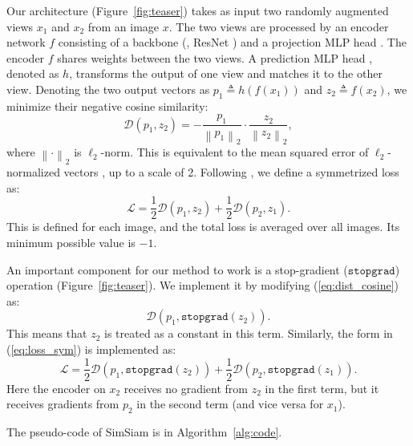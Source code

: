 \documentclass[final]{cvpr}
\newcommand{\dist}{\mathcal{D}}
\newcommand{\p}{{p}}  \newcommand{\z}{{z}}
\begin{document}
Our architecture (Figure~\ref{fig:teaser}) takes as input two randomly augmented views $x_1$ and $x_2$ from an image $x$.
The two views are processed by an encoder network $f$ consisting of a backbone (\eg, ResNet \cite{He2016}) and a projection MLP head \cite{Chen2020}. The encoder $f$ shares weights between the two views. A prediction MLP head \cite{Grill2020}, denoted as $h$, transforms the output of one view and matches it to the other view.
Denoting the two output vectors as $\p_1\!\triangleq\!h(f(x_1))$ and $\z_2\!\triangleq\!f(x_2)$,
we minimize their negative cosine similarity:
\newcommand{\lnorm}[1]{\frac{#1}{\left\lVert{#1}\right\rVert _2}}
\newcommand{\lnormv}[1]{{#1}/{\left\lVert{#1}\right\rVert _2}}
\begin{equation}
\dist(\p_1, \z_2) = - \lnorm{\p_1}{\cdot}\lnorm{\z_2},
\label{eq:dist_cosine}
\end{equation}
where ${\left\lVert{\cdot}\right\rVert _2}$ is $\ell_2$-norm. This is equivalent to the mean squared error of $\ell_2$-normalized vectors \cite{Grill2020}, up to a scale of 2.
Following \cite{Grill2020}, we define a symmetrized loss as:
\begin{equation}
\mathcal{L} = \frac{1}{2}\dist(\p_1, \z_2) + \frac{1}{2}\dist(\p_2, \z_1).
\label{eq:loss_sym}
\end{equation} 
This is defined for each image, and the total loss is averaged over all images. Its minimum possible value is $-1$.

An important component for our method to work is a \mbox{stop-gradient} ($\texttt{stopgrad}$) operation (Figure~\ref{fig:teaser}). We implement it by modifying (\ref{eq:dist_cosine}) as:
\begin{equation}
\dist(\p_1, \texttt{stopgrad}(\z_2)).
\label{eq:loss_asym_stopgrad}
\end{equation}
This means that $\z_2$ is treated as a constant in this term.
Similarly, the form in (\ref{eq:loss_sym}) is implemented as:
\begin{equation}
\mathcal{L}{=}\frac{1}{2}\dist(\p_1, \texttt{stopgrad}(\z_2)){+}\frac{1}{2}\dist(\p_2, \texttt{stopgrad}(\z_1)).
\label{eq:loss_sym_stopgrad}
\end{equation}
Here the encoder on $x_2$ receives no gradient from $\z_2$ in the first term, but it receives gradients from $\p_2$ in the second term (and vice versa for $x_1$).

The pseudo-code of SimSiam is in Algorithm~\ref{alg:code}.
\end{document}
